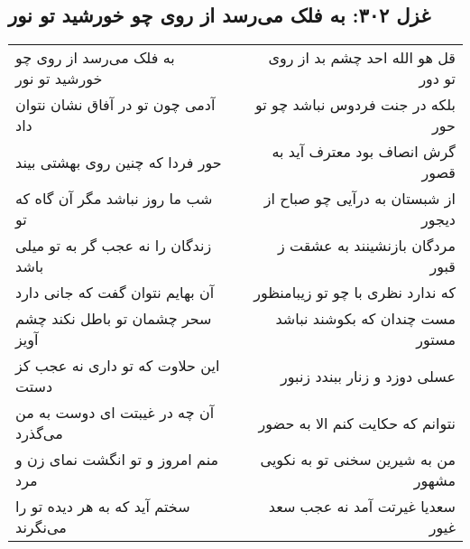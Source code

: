 \begin{center}
\section*{غزل ۳۰۲: به فلک می‌رسد از روی چو خورشید تو نور}
\label{sec:302}
\begin{longtable}{l p{0.5cm} r}
به فلک می‌رسد از روی چو خورشید تو نور
&&
قل هو الله احد چشم بد از روی تو دور
\\
آدمی چون تو در آفاق نشان نتوان داد
&&
بلکه در جنت فردوس نباشد چو تو حور
\\
حور فردا که چنین روی بهشتی بیند
&&
گرش انصاف بود معترف آید به قصور
\\
شب ما روز نباشد مگر آن گاه که تو
&&
از شبستان به درآیی چو صباح از دیجور
\\
زندگان را نه عجب گر به تو میلی باشد
&&
مردگان بازنشینند به عشقت ز قبور
\\
آن بهایم نتوان گفت که جانی دارد
&&
که ندارد نظری با چو تو زیبامنظور
\\
سحر چشمان تو باطل نکند چشم آویز
&&
مست چندان که بکوشند نباشد مستور
\\
این حلاوت که تو داری نه عجب کز دستت
&&
عسلی دوزد و زنار ببندد زنبور
\\
آن چه در غیبتت ای دوست به من می‌گذرد
&&
نتوانم که حکایت کنم الا به حضور
\\
منم امروز و تو انگشت نمای زن و مرد
&&
من به شیرین سخنی تو به نکویی مشهور
\\
سختم آید که به هر دیده تو را می‌نگرند
&&
سعدیا غیرتت آمد نه عجب سعد غیور
\\
\end{longtable}
\end{center}
